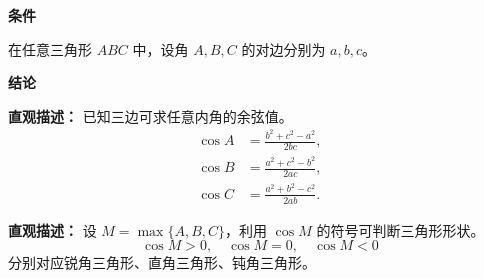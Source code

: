 \begin{statementbox}
	\textbf{\textcolor{CStatement}{条件}}
	\begin{description}[style=nextline, leftmargin=2.8em, labelsep=0.5em, itemsep=0.35em]
		\item[\textbf{\textcolor{CStatement}{条件 1（三角形边角）：}}] 在任意三角形 $ABC$ 中，设角 $A,B,C$ 的对边分别为 $a,b,c$。
	\end{description}

	\textbf{\textcolor{CStatement}{结论}}
	\begin{description}[style=nextline, leftmargin=2.8em, labelsep=0.5em, itemsep=0.45em]
		\item[\textbf{\textcolor{CStatement}{结论一（余弦值公式）：}}]
			\textbf{\textcolor{CStatement}{直观描述：}}
			已知三边可求任意内角的余弦值。
			\[
				\begin{aligned}
					\cos A &= \frac{b^{2}+c^{2}-a^{2}}{2bc},\\
					\cos B &= \frac{a^{2}+c^{2}-b^{2}}{2ac},\\
					\cos C &= \frac{a^{2}+b^{2}-c^{2}}{2ab}.
			\end{aligned}
			\]

		\item[\textbf{\textcolor{CStatement}{推广结论（判断形状）：}}]
			\textbf{\textcolor{CStatement}{直观描述：}}
			设 $M=\max\{A,B,C\}$，利用 $\cos M$ 的符号可判断三角形形状。
			\[
				\cos M > 0,\quad \cos M = 0,\quad \cos M < 0
			\]
			分别对应锐角三角形、直角三角形、钝角三角形。
	\end{description}
\end{statementbox}
